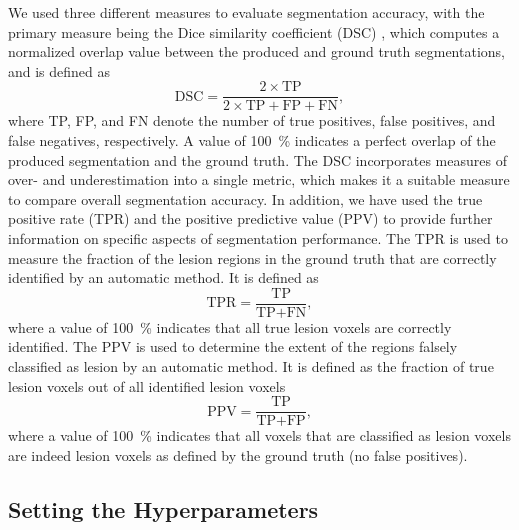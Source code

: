 
We used three different measures to evaluate segmentation accuracy, with the
primary measure being the Dice similarity coefficient (DSC)
\cite{dice1945measures}, which computes a normalized overlap value between the
produced and ground truth segmentations, and is defined as
\begin{equation}
\text{DSC} = \frac{2 \times \text{TP}}{2 \times \text{TP} + \text{FP} +
\text{FN}},
\end{equation}
where TP, FP, and FN denote the number of true positives, false positives, and
false negatives, respectively. A value of \SI{100}{\percent} indicates a perfect
overlap of the produced segmentation and the ground truth.
The DSC incorporates measures of over- and underestimation into a single
metric, which makes it a suitable measure to compare overall segmentation
accuracy.
In addition, we have used the true positive rate (TPR) and the positive
predictive value (PPV) to provide further information on specific aspects of
segmentation performance. The TPR is used to measure the fraction of the lesion
regions in the ground truth that are correctly identified by
an automatic method. It is defined as
\begin{equation}
\text{TPR} = \frac{\text{TP}}{\text{TP} + \text{FN}},
\end{equation}
where a value of \SI{100}{\percent} indicates that all true lesion voxels are
correctly identified. The PPV is used to determine the extent of the regions
falsely classified as lesion by an automatic method. It is defined as the
fraction of true lesion voxels out of all identified lesion voxels
\begin{equation}
\text{PPV} = \frac{\text{TP}}{\text{TP} + \text{FP}},
\end{equation}
where a value of \SI{100}{\percent} indicates that all voxels that are
classified as lesion voxels are indeed lesion voxels as defined by the ground
truth (no false positives).

\subsection{Setting the Hyperparameters}

